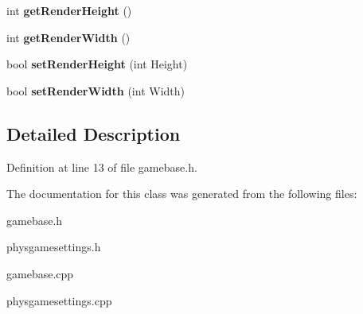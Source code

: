 \begin{DoxyCompactItemize}
\item 
\hypertarget{classSettings_a0d620300e6eb872e6914cabad3035641}{
int {\bfseries getRenderHeight} ()}
\label{df/d9a/classSettings_a0d620300e6eb872e6914cabad3035641}

\item 
\hypertarget{classSettings_aea6ac481630cf986acf3853939c6bdf3}{
int {\bfseries getRenderWidth} ()}
\label{df/d9a/classSettings_aea6ac481630cf986acf3853939c6bdf3}

\item 
\hypertarget{classSettings_a0381303bcccf944c77b8f88dcb4ffa96}{
bool {\bfseries setRenderHeight} (int Height)}
\label{df/d9a/classSettings_a0381303bcccf944c77b8f88dcb4ffa96}

\item 
\hypertarget{classSettings_abb497fd25c4184054c1bb89a7e58b5d3}{
bool {\bfseries setRenderWidth} (int Width)}
\label{df/d9a/classSettings_abb497fd25c4184054c1bb89a7e58b5d3}

\end{DoxyCompactItemize}


\subsection{Detailed Description}


Definition at line 13 of file gamebase.h.

The documentation for this class was generated from the following files:\begin{DoxyCompactItemize}
\item 
gamebase.h\item 
physgamesettings.h\item 
gamebase.cpp\item 
physgamesettings.cpp\end{DoxyCompactItemize}
